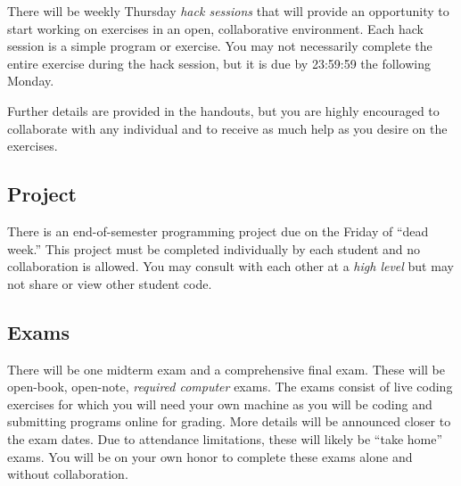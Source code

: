 \documentclass[12pt]{scrartcl}
\begin{document}
There will be weekly Thursday \emph{hack sessions} that will provide an
opportunity to start working on exercises in an open, collaborative
environment.  Each hack session is a simple program or exercise.
You may not necessarily complete the entire exercise during the hack
session, but it is due by 23:59:59 the following Monday.

Further details are provided in the handouts, but you are highly 
encouraged to collaborate with any individual and to receive as much
help as you desire on the exercises.  


\subsection{Project}

There is an end-of-semester programming project due on the Friday
of ``dead week.''  This project must be completed individually by
each student and no collaboration is allowed.  You may consult with
each other at a \emph{high level} but may not share or view other
student code.  

\subsection{Exams}

There will be one midterm exam and a comprehensive final exam.  These
will be open-book, open-note, \emph{required computer} exams.  The
exams consist of live coding exercises for which you will need your
own machine as you will be coding and submitting programs online for
grading.  More details will be announced closer to the exam dates.
Due to attendance limitations, these will likely be ``take home''
exams.  You will be on your own honor to complete these exams alone
and without collaboration.

\end{document}
